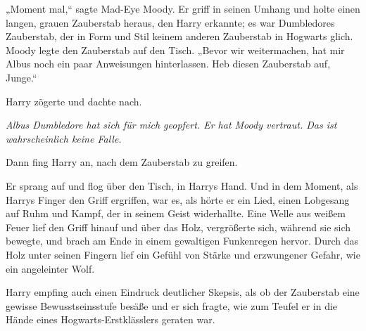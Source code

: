 „Moment mal,“ sagte Mad-Eye Moody.
Er griff in seinen Umhang und holte einen langen, grauen Zauberstab heraus, den Harry erkannte; es war Dumbledores Zauberstab, der in Form und Stil keinem anderen Zauberstab in Hogwarts glich.
Moody legte den Zauberstab auf den Tisch.
„Bevor wir weitermachen, hat mir Albus noch ein paar Anweisungen hinterlassen. Heb diesen Zauberstab auf, Junge.“

Harry zögerte und dachte nach.

\emph{Albus Dumbledore hat sich für mich geopfert. Er hat Moody vertraut. Das ist wahrscheinlich keine Falle.}

Dann fing Harry an, nach dem Zauberstab zu greifen.

Er sprang auf und flog über den Tisch, in Harrys Hand. Und in dem Moment, als Harrys Finger den Griff ergriffen, war es, als hörte er ein Lied, einen Lobgesang auf Ruhm und Kampf, der in seinem Geist widerhallte. Eine Welle aus weißem Feuer lief den Griff hinauf und über das Holz, vergrößerte sich, während sie sich bewegte, und brach am Ende in einem gewaltigen Funkenregen hervor. Durch das Holz unter seinen Fingern lief ein Gefühl von Stärke und erzwungener Gefahr, wie ein angeleinter Wolf.

Harry empfing auch einen Eindruck deutlicher Skepsis, als ob der Zauberstab eine gewisse Bewusstseinsstufe besäße und er sich fragte, wie zum Teufel er in die Hände eines Hogwarts-Erstklässlers geraten war.

